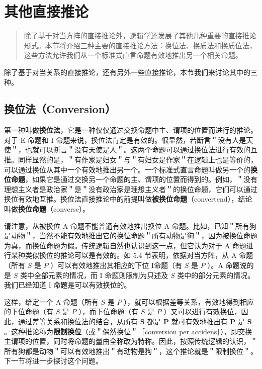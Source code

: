 \section{其他直接推论}

\begin{quotation}
除了基于对当方阵的直接推论外，逻辑学还发展了其他几种重要的直接推论形式。本节将介绍三种主要的直接推论方法：换位法、换质法和换质位法，这些方法允许我们从一个标准式直言命题有效地推出另一个相关命题。
\end{quotation}

除了基于对当关系的直接推论，还有另外一些直接推论，本节我们来讨论其中的三种。

\subsection{换位法（Conversion）}
第一种叫做\textbf{换位法}，它是一种仅仅通过交换命题中主、谓项的位置而进行的推论。对于 E 命题和 I 命题来说，换位法肯定是有效的。很显然，若断言＂没有人是天使＂，也就可以断言＂没有天使是人＂。这两个命题可以通过换位法进行有效的互推。同样显然的是，＂有作家是妇女＂与＂有妇女是作家＂在逻辑上也是等价的，可以通过换位从其中一个有效地推出另一个。一个标准式直言命题叫做另一个的\textbf{换位命题}，如果它是通过交换另一个命题的主、谓项的位置而得到的。例如，＂没有理想主义者是政治家＂是＂没有政治家是理想主义者＂的换位命题，它们可以通过换位有效地互推。换位法直接推论中的前提叫做\textbf{被换位命题}（convertend），结论叫做\textbf{换位命题}（converse）。

请注意，从被换位 A 命题不能普通有效地推出换位 A 命题。比如，已知＂所有狗是动物＂，当然不能有效地推出它的换位命题＂所有动物是狗＂，因为被换位命题为真，而换位命题为假。传统逻辑自然也认识到这一点，但它认为对于 A 命题进行某种类似换位的推论可以是有效的。如 5.4 节表明，依据对当方阵，从 A 命题（所有 $S$ 是 $P$ ）可以有效地推出其相应的下位 I命题（有 $S$ 是 $P$ ）。A 命题说的是 $S$ 类中全部元素的情况，而 I 命题则限制为只述及 $S$ 类中的部分元素的情况。我们已经知道 I 命题是可以有效换位的。

这样，给定一个 A 命题（所有 $S$ 是 $P$ ），就可以根据差等关系，有效地得到相应的下位命题（有 $S$ 是 $P$ ），而下位命题（有 $S$ 是 $P$ ）又可以进行有效换位，因此，通过差等关系和换位法的结合，从所有 $\boldsymbol{S}$ 都是 $\boldsymbol{P}$ 就可有效地推出有 $\boldsymbol{P}$ 是 $\boldsymbol{S}$ 。这种推论称为\textbf{限制换位}（或＂偶然换位＂［conversion per accidens］），即交换主谓项的位置，同时将命题的量由全称改为特称。因此，按照传统逻辑的认识，＂所有狗都是动物＂可以有效地推出＂有动物是狗＂，这个推论就是＂限制换位＂。下一节将进一步探讨这个问题。

